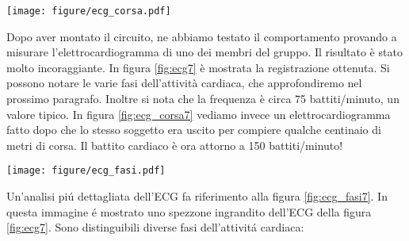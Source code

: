 \begin{SCfigure*}[][p]
    \texttt{[image: figure/ecg\_corsa.pdf]}
    \caption{ECG dello stesso soggetto dell'ECG in figura \ref{fig:ecg7} soltanto che in questo caso
        il paziente é uscito dal laboratorio e ha percorso qualche centinaio di metri di corsa prima della misura.
        Di conseguenza, il battito é salito a circa 150 battiti/minuto, o circa 400 ms tra i battiti, sempre con una
        precisione di pochi millisecondi. Questo ECG é un poco piú rumoroso del precedente.}
    \label{fig:ecg_corsa7}
\end{SCfigure*}

Dopo aver montato il circuito, ne abbiamo testato il comportamento provando a misurare l'elettrocardiogramma
di uno dei membri del gruppo. Il risultato è stato molto incoraggiante. In figura \ref{fig:ecg7} è mostrata
la registrazione ottenuta. Si possono notare le varie fasi dell'attività cardiaca, che approfondiremo nel
prossimo paragrafo. Inoltre si nota che la frequenza è circa 75 battiti/minuto, un valore tipico.
In figura \ref{fig:ecg_corsa7} vediamo invece un elettrocardiogramma fatto dopo che lo stesso soggetto
era uscito per compiere qualche centinaio di metri di corsa. Il battito cardiaco è ora attorno a 150 battiti/minuto!

\begin{SCfigure*}[][p]
    \texttt{[image: figure/ecg\_fasi.pdf]}
    \caption{Quest'immagine é un ingrandimento della figura \ref{fig:ecg7} e rappresentano un tipico
        battito cardiaco visto tramite ECG. Si vedono molto bene le varie onde generate dalle fasi dell'attivitá cardiaca.
        Riassumendo quanto scritto nel testo: \textbf{P} é la fase di contrazione degli atrii, \textbf{QRS} é l'onda generata dalla
        contrazione dei ventricoli, \textbf{T} é il rilassamento dei ventricoli e \textbf{U} é generata dal setto interventricolare.}
    \label{fig:ecg_fasi7}
\end{SCfigure*}

Un'analisi piú dettagliata dell'ECG fa riferimento alla figura \ref{fig:ecg_fasi7}.
In questa immagine é mostrato uno spezzone ingrandito dell'ECG della figura \ref{fig:ecg7}.
Sono distinguibili diverse fasi dell'attivitá cardiaca:

